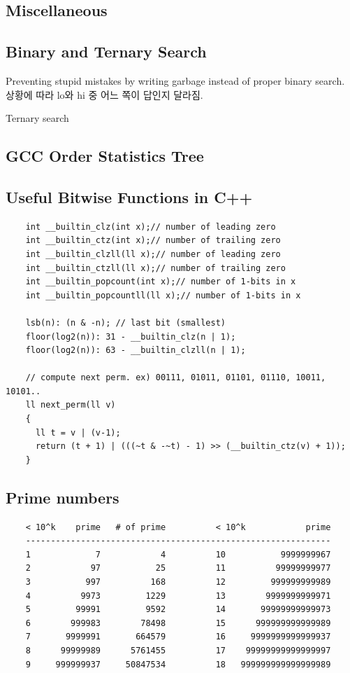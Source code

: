 \documentclass[landscape,8pt]{article}
\begin{document}
\begin{multicols}{2}
\section{Miscellaneous}
  \subsection{Binary and Ternary Search}
    Preventing stupid mistakes by writing garbage instead of proper binary search.\\
    상황에 따라 lo와 hi 중 어느 쪽이 답인지 달라짐.
    
    Ternary search
    
  \subsection{GCC Order Statistics Tree}
    
  \subsection{Useful Bitwise Functions in C++}
  \begin{verbatim}
    int __builtin_clz(int x);// number of leading zero
    int __builtin_ctz(int x);// number of trailing zero
    int __builtin_clzll(ll x);// number of leading zero
    int __builtin_ctzll(ll x);// number of trailing zero
    int __builtin_popcount(int x);// number of 1-bits in x
    int __builtin_popcountll(ll x);// number of 1-bits in x

    lsb(n): (n & -n); // last bit (smallest)
    floor(log2(n)): 31 - __builtin_clz(n | 1);
    floor(log2(n)): 63 - __builtin_clzll(n | 1);

    // compute next perm. ex) 00111, 01011, 01101, 01110, 10011, 10101..
    ll next_perm(ll v)
    {
      ll t = v | (v-1);
      return (t + 1) | (((~t & -~t) - 1) >> (__builtin_ctz(v) + 1));
    }
  \end{verbatim}
  \pagebreak
  \subsection{Prime numbers}
  \begin{verbatim}
    < 10^k    prime   # of prime          < 10^k            prime
    -------------------------------------------------------------
    1             7            4          10           9999999967
    2            97           25          11          99999999977
    3           997          168          12         999999999989
    4          9973         1229          13        9999999999971
    5         99991         9592          14       99999999999973
    6        999983        78498          15      999999999999989
    7       9999991       664579          16     9999999999999937
    8      99999989      5761455          17    99999999999999997
    9     999999937     50847534          18   999999999999999989
  \end{verbatim}

\end{multicols}
\end{document}
